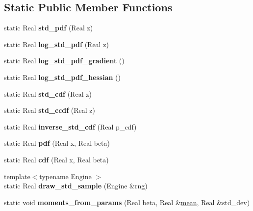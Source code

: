 \subsection*{Static Public Member Functions}
\begin{DoxyCompactItemize}
\item 
static Real {\bfseries std\+\_\+pdf} (Real z)\label{classPecos_1_1ExponentialRandomVariable_a1723ee7569b2b6dd6413dc9ffc0382b6}

\item 
static Real {\bfseries log\+\_\+std\+\_\+pdf} (Real z)\label{classPecos_1_1ExponentialRandomVariable_a9672626f0688946d80b65a8fd041aa03}

\item 
static Real {\bfseries log\+\_\+std\+\_\+pdf\+\_\+gradient} ()\label{classPecos_1_1ExponentialRandomVariable_a7618ae9c081763dbdd0cfcacde4c546f}

\item 
static Real {\bfseries log\+\_\+std\+\_\+pdf\+\_\+hessian} ()\label{classPecos_1_1ExponentialRandomVariable_ae4d8f47aa3f234d3887059246d213335}

\item 
static Real {\bfseries std\+\_\+cdf} (Real z)\label{classPecos_1_1ExponentialRandomVariable_a62b98da8336394c9e30ea9fd5e79b2e5}

\item 
static Real {\bfseries std\+\_\+ccdf} (Real z)\label{classPecos_1_1ExponentialRandomVariable_aa02b173cdbee0e135e5501acc7edd639}

\item 
static Real {\bfseries inverse\+\_\+std\+\_\+cdf} (Real p\+\_\+cdf)\label{classPecos_1_1ExponentialRandomVariable_ad0d24d0f74c6ff422ffb64f8204e5c04}

\item 
static Real {\bfseries pdf} (Real x, Real beta)\label{classPecos_1_1ExponentialRandomVariable_add6cde01224e168e6234fad2bbf01f7c}

\item 
static Real {\bfseries cdf} (Real x, Real beta)\label{classPecos_1_1ExponentialRandomVariable_acbf74fe4bbce1f6137fa686bd385a658}

\item 
{\footnotesize template$<$typename Engine $>$ }\\static Real {\bfseries draw\+\_\+std\+\_\+sample} (Engine \&rng)\label{classPecos_1_1ExponentialRandomVariable_a6fcc236683df40e8eb64ea81b5e38de9}

\item 
static void {\bfseries moments\+\_\+from\+\_\+params} (Real beta, Real \&\hyperlink{classPecos_1_1ExponentialRandomVariable_a962ffe5a3593be370d5c883365c060f4}{mean}, Real \&std\+\_\+dev)\label{classPecos_1_1ExponentialRandomVariable_ae120e7a15e3a8bb771840755e03e717e}

\end{DoxyCompactItemize}
